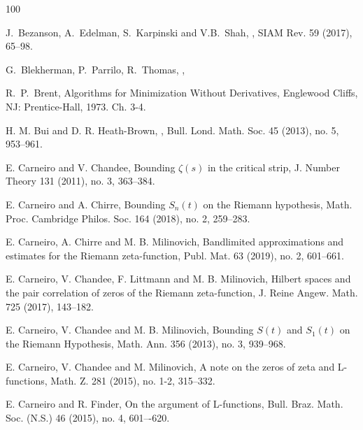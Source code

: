 \documentclass[reqno]{amsart}
\begin{document}
\begin{thebibliography}{100}
	
	
	J.~Bezanson, A.~Edelman, S.~Karpinski and V.B.~Shah,
	,
	\newblock SIAM Rev. 59 (2017), 65--98. 
	
	
	G.~Blekherman, P.~Parrilo, R.~Thomas,
	,
	
	
	R.~P.~Brent,
	\newblock Algorithms for Minimization Without Derivatives,
	\newblock Englewood Cliffs, NJ: Prentice-Hall, 1973. Ch. 3-4.
	
	
	H. M. Bui and D. R. Heath-Brown,
	, 
	\newblock Bull. Lond. Math. Soc. 45 (2013), no. 5, 953--961.
	
	
	E. Carneiro and V. Chandee,
	\newblock Bounding $\zeta(s)$ in the critical strip,
	\newblock J. Number Theory 131 (2011), no. 3, 363--384.
	
	
	E. Carneiro and A. Chirre,
	\newblock Bounding $S_n(t)$ on the Riemann hypothesis,
	\newblock Math. Proc. Cambridge Philos. Soc. 164 (2018), no. 2, 259--283.
	
	
	  E. Carneiro, A. Chirre and M. B. Milinovich,
\newblock Bandlimited approximations and estimates for the Riemann zeta-function,
\newblock Publ.  Mat.  63 (2019), no.  2, 601--661.

	
	
	E. Carneiro, V. Chandee, F. Littmann and M. B. Milinovich,
	\newblock Hilbert spaces and the pair correlation of zeros of the Riemann zeta-function, 
	\newblock  J. Reine Angew. Math. 725 (2017), 143--182.
	
	
	E. Carneiro, V. Chandee and M. B. Milinovich,
	\newblock Bounding $S(t)$ and $S_1(t)$ on the Riemann Hypothesis,
	\newblock Math. Ann. 356 (2013), no. 3, 939--968.
	
	
	E. Carneiro, V. Chandee and M. Milinovich,
	\newblock A note on the zeros of zeta and L-functions,
	\newblock Math. Z. 281 (2015), no. 1-2, 315--332.
	
	
	
	E. Carneiro and R. Finder,
	\newblock On the argument of L-functions,
	\newblock Bull. Braz. Math. Soc. (N.S.) 46 (2015), no. 4, 601–-620.
	

\end{thebibliography}
\end{document}
